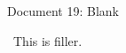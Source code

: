 \documentclass[11 pt]{article}
\begin{document}
\begin{center}
Document 19: Blank
\end{center}

\setlength{\leftskip}{0 in}
$\,\,\,$This is filler.
\end{document}
